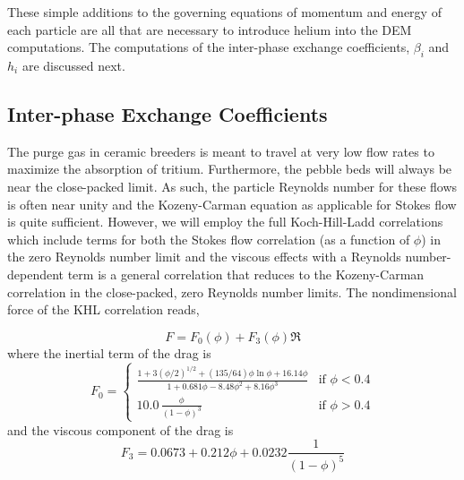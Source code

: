 These simple additions to the governing equations of momentum and energy of each particle are all that are necessary to introduce helium into the DEM computations. The computations of the inter-phase exchange coefficients, $\beta_i$ and $h_i$ are discussed next.

\subsection{Inter-phase Exchange Coefficients}

The purge gas in ceramic breeders is meant to travel at very low flow rates to maximize the absorption of tritium. Furthermore, the pebble beds will always be near the close-packed limit. As such, the particle Reynolds number for these flows is often near unity and the Kozeny-Carman equation as applicable for Stokes flow is quite sufficient. However, we will employ the full Koch-Hill-Ladd correlations which include terms for both the Stokes flow correlation (as a function of $\phi$) in the zero Reynolds number limit and the viscous effects with a Reynolds number-dependent term is a general correlation that reduces to the Kozeny-Carman correlation in the close-packed, zero Reynolds number limits. The nondimensional force of the KHL correlation reads,

\begin{equation}\label{eq:khl-correlation}
	F = F_0(\phi) + F_3(\phi)\Re
\end{equation}
where the inertial term of the drag is
\begin{equation}
F_0 = \begin{cases}
	\frac{1+3(\phi/2)^{1/2} + (135/64)\phi\ln\phi + 16.14\phi}{1 + 0.681\phi - 8.48 \phi^2 + 8.16\phi^3} & \text{if $\phi < 0.4$}\\
	10.0\,\frac{\phi}{(1-\phi)^3} & \text{if $\phi > 0.4$} 
	\end{cases}
\end{equation}
and the viscous component of the drag is
\begin{equation}
	F_3 = 0.0673 + 0.212\phi + 0.0232 \frac{1}{(1-\phi)^5}
\end{equation}

